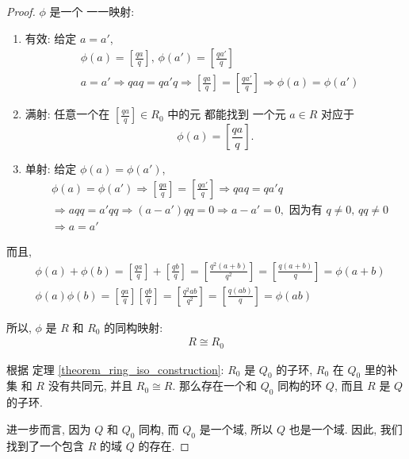 \documentclass[utf8]{ctexbook}
\begin{document}
\begin{proof}
$\phi$ 是一个 一一映射:
\begin{enumerate}
\item{有效: 给定 $a = a'$,
\begin{align*}
& \phi(a) = \left[ \frac{q a}{q} \right], \, \phi(a') = \left[ \frac{q a'}{q} \right] \\
& a = a' \Longrightarrow q a q = q a' q \Longrightarrow \left[ \frac{q a}{q} \right] = \left[ \frac{q a'}{q} \right] \Longrightarrow \phi(a) = \phi(a')
\end{align*}
}
\item{满射: 任意一个在 $\left[ \frac{q a}{q} \right] \in R_0$ 中的元 都能找到 一个元 $a \in R$ 对应于 
$$\phi(a) = \left[ \frac{q a}{q} \right] .$$}
\item{单射: 给定 $\phi(a) = \phi(a') $, 
\begin{align*}
& \phi(a) = \phi(a') \Longrightarrow \left[ \frac{q a}{q} \right] = \left[ \frac{q a'}{q} \right] \Longrightarrow q a q = q a' q \\
& \Longrightarrow a q q = a' q q \Longrightarrow (a - a') q q = 0 \Longrightarrow a - a' = 0, \mbox{ 因为有 } q \neq 0, \, q q \neq 0 \\
& \Longrightarrow a = a' 
\end{align*}
}
\end{enumerate}

而且,
\begin{align*}
& \phi(a) + \phi(b) = \left[ \frac{q a}{q} \right] + \left[ \frac{q b}{q} \right] = \left[ \frac{q^2 (a + b)  }{q^2 } \right] = \left[ \frac{q (a + b)  }{q } \right] = \phi(a+b) \\
& \phi(a)  \phi(b) =  \left[ \frac{q a}{q} \right]  \left[ \frac{q b}{q} \right] = \left[ \frac{q^2 a b}{q^2} \right] = \left[ \frac{q (a b) }{q} \right] = \phi(ab)
\end{align*}

所以, $\phi$ 是 $R$ 和 $R_0$ 的同构映射:
\begin{align*}
R \cong R_0
\end{align*}

根据 定理 \ref{theorem_ring_iso_construction}: $R_0$ 是 $Q_0$ 的子环, $R_0$ 在 $Q_0$ 里的补集 和 $R$ 没有共同元, 并且 $R_0 \cong R$. 那么存在一个和 $Q_0$ 同构的环 $Q$, 而且 $R$ 是 $Q$ 的子环. 

进一步而言, 因为 $Q$ 和 $Q_0$ 同构, 而 $Q_0$ 是一个域, 所以 $Q$ 也是一个域. 因此, 我们找到了一个包含 $R$ 的域 $Q$ 的存在.

\end{proof}
\end{document}
